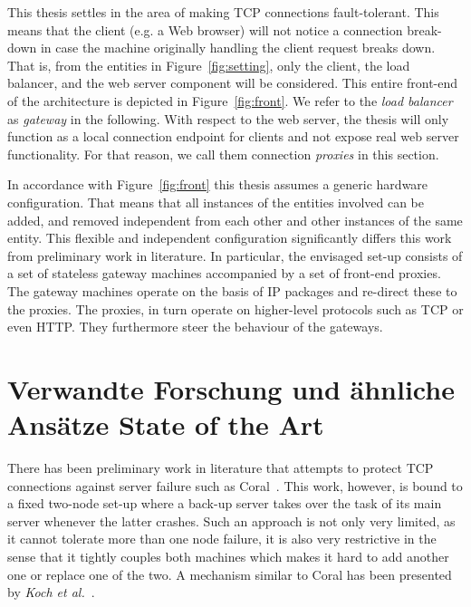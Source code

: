 \documentclass[10pt,a4paper,oneside]{scrartcl}
\newcommand\hint[2]{
\ifthenelse{\boolean{showhints}}{
\begin{center}
\colorbox{black!10}{
\begin{minipage}{.963\textwidth}
#2\hfill\textbf{#1}
\end{minipage}
}\end{center}}{}
}
\begin{document}
	This thesis settles in the area of making TCP connections fault-tolerant. This means that
	the client (e.g. a Web browser) will not notice a connection break-down in case the machine
	originally handling the client request breaks down. That is, from the entities in
	Figure~\ref{fig:setting}, only the client, the load balancer, and the web server component
	will be considered. This entire front-end of the architecture is depicted in
	Figure~\ref{fig:front}. We refer to the \emph{load balancer} as \emph{gateway} in the
	following. With respect to the web server, the thesis will only function as a local 
	connection endpoint for clients and not expose real web server functionality. For that
	reason, we call them connection \emph{proxies} in this section.
		
	In accordance with Figure~\ref{fig:front} this thesis assumes a generic hardware
	configuration. That means that all instances of the entities involved can be added,
	and removed independent from each other and other instances of the same entity. This 
	flexible and independent configuration significantly differs this work from preliminary
	work in literature. In particular, the envisaged set-up consists of a set of stateless
	gateway machines accompanied by a set of front-end proxies. The gateway machines operate on
	the basis of IP packages and re-direct these to the proxies. The proxies, in turn operate
	on higher-level protocols such as TCP or even HTTP. They furthermore steer the behaviour of
	the gateways.




\section{
	{Verwandte Forschung und ähnliche Ansätze}
	{State of the Art}}
\label{sec:state_of_the_art}

	There has been preliminary work in literature that attempts to protect TCP connections 
	against server failure such as Coral~\cite{aghdaie09coral}. This work, however, is bound 
	to a fixed two-node set-up where a back-up server takes over the task of its main server
	whenever the latter crashes. Such an approach is not only very limited, as it cannot
	tolerate more than one node failure, it is also very restrictive in the sense that it
	tightly couples both machines which makes it hard to add another one or replace one of the
	two. A mechanism similar to Coral has been presented by \emph{Koch et
	al.}~\cite{koch03transparent}.
\end{document}
